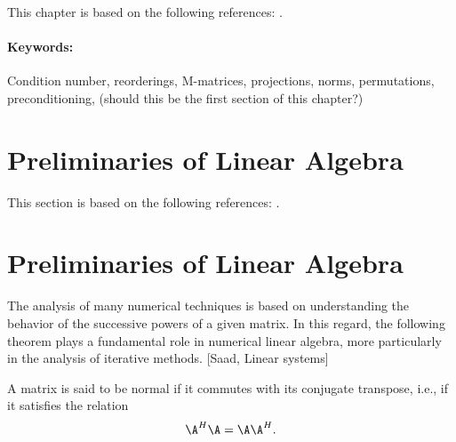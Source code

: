 \ifnum{}
\vspace{1.cm}
This chapter is based on the following references: \cite{BenFroNabSzy01, ChaMat94, DolJolNat15, EchLieSzyTic18, EchLieTic19, ElmSilWat14, FraLiuRooStyZho09, Gal13, Gan08, GolVan13, Gre97, GriDolSil15, Hac10, HorJoh12, KopOri10, LanRosSzy91, LieStr03, LieStr12, Lin10, MacOriShi00, MacOriShi02, MilOriShi96, Sch69, Saa03, Smi85, Sty05, TosWid05, Var09}.

\paragraph{Keywords:} Condition number, reorderings, M-matrices, projections, norms, permutations, preconditioning, (should this be the first section of this chapter?)

\section{Preliminaries of Linear Algebra}
This section is based on the following references: \cite{Gal13, GolVan13, HorJoh12, Saa03}.


\else


\section{Preliminaries of Linear Algebra}
\label{App:linalg}


The analysis of many numerical techniques is based on understanding the
behavior of the successive powers of a given matrix. In this regard, the
following theorem plays a fundamental role in numerical linear algebra,
more particularly in the analysis of iterative methods. [Saad, Linear systems]

\begin{definition}
A matrix is said to be normal if it commutes with its conjugate transpose,
i.e., if it satisfies the relation
\[\A^H\A=\A\A^H.\]
\end{definition}


